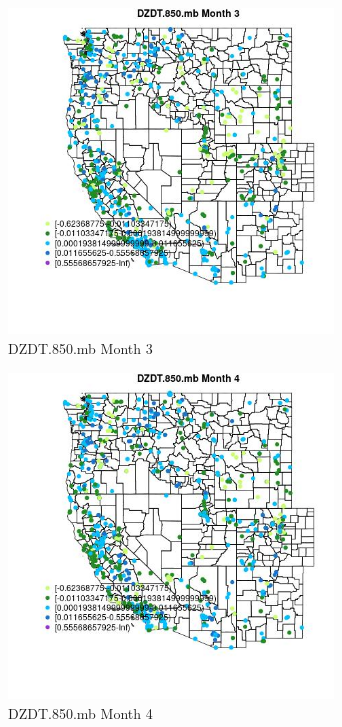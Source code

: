 \begin{figure} 
\centering  
\includegraphics[width=0.77\textwidth]{Code_Outputs/Report_ML_input_PM25_Step4_part_e_de_duplicated_aves_compiled_2019-05-21wNAs_MapObsMo3DZDT850mb.jpg} 
\caption{\label{fig:Report_ML_input_PM25_Step4_part_e_de_duplicated_aves_compiled_2019-05-21wNAsMapObsMo3DZDT850mb}DZDT.850.mb Month 3} 
\end{figure} 
 

\begin{figure} 
\centering  
\includegraphics[width=0.77\textwidth]{Code_Outputs/Report_ML_input_PM25_Step4_part_e_de_duplicated_aves_compiled_2019-05-21wNAs_MapObsMo4DZDT850mb.jpg} 
\caption{\label{fig:Report_ML_input_PM25_Step4_part_e_de_duplicated_aves_compiled_2019-05-21wNAsMapObsMo4DZDT850mb}DZDT.850.mb Month 4} 
\end{figure} 
 

